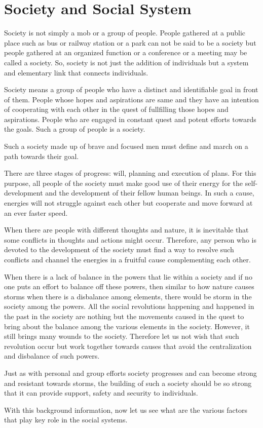 \chapter{Society and Social System}
Society is not simply a mob or a group of people. People gathered at a public
place such as bus or railway station or a park can not be said to be a society
but people gathered at an organized function or a conference or a meeting may
be called a society. So, society is not just the addition of individuals but a
system and elementary link that connects individuals.  

Society means a group of people who have a distinct and identifiable goal in
front of them. People whose hopes and aspirations are same and they have an
intention of cooperating with each other in the quest of fullfilling those
hopes and aspirations. People who are engaged in constant quest and potent
efforts towards the goals. Such a group of people is a society.

Such a society made up of brave and focused men must define and march on a path
towards their goal.

There are three stages of progress: will, planning and execution of plans. For
this purpose, all people of the society must make good use of their energy for
the self-development and the development of their fellow human beings. In such
a cause, energies will not struggle against each other but cooperate and move
forward at an ever faster speed.

When there are people with different thoughts and nature, it is inevitable that
some conflicts in thoughts and actions might occur. Therefore, any person who
is devoted to the development of the society must find a way to resolve such
conflicts and channel the energies in a fruitful cause complementing each
other. 

When there is a lack of balance in the powers that lie within a society and if
no one puts an effort to balance off these powers, then similar to how nature
causes storms when there is a disbalance among elements, there would be storm
in the society among the powers. All the social revolutions happening and
happened in the past in the society are nothing but the movements caused in the
quest to bring about the balance among the various elements in the society.
However, it still brings many wounds to the society. Therefore let us not wish
that such revolution occur but work together towards causes that avoid the
centralization and disbalance of such powers.

Just as with personal and group efforts society progresses and can become
strong and resistant towards storms, the building of such a society should be
so strong that it can provide support, safety and security to individuals.

With this background information, now let us see what are the various factors
that play key role in the social systems.
